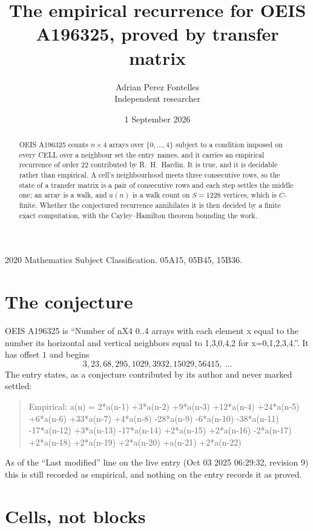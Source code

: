 \documentclass[11pt,a4paper]{article}
\title{The empirical recurrence for OEIS A196325, proved by transfer matrix}
\author{Adrian Perez Fontelles\\ \small Independent researcher}
\date{1 September 2026}
\theoremstyle{plain}
\theoremstyle{definition}
\begin{document}
\maketitle

\begin{abstract}
OEIS A196325 counts $n\times4$ arrays over $\{0,\dots,4\}$ subject to a condition imposed on
every CELL over a neighbour set the entry names, and it carries an empirical recurrence of
order $22$ contributed by R.~H.~Hardin. It is true, and it is decidable rather than
empirical. A cell's neighbourhood meets three consecutive rows, so the state of a transfer
matrix is a pair of consecutive rows and each step settles the middle one; an array is a
walk, and $a(n)$ is a walk count on $S=1228$ vertices, which is $C$-finite. Whether the
conjectured recurrence annihilates it is then decided by a finite exact computation, with the
Cayley--Hamilton theorem bounding the work.
\end{abstract}

\noindent\small 2020 Mathematics Subject Classification. 05A15, 05B45, 15B36.\normalsize

\section{The conjecture}

OEIS A196325 is ``Number of nX4 0..4 arrays with each element x equal to the number its horizontal and vertical neighbors equal to 1,3,0,4,2 for x=0,1,2,3,4.''. It has offset $1$ and begins
\[
3, 23, 68, 295, 1029, 3932, 15029, 56415,\ \dots
\]
The entry states, as a conjecture contributed by its author and never marked settled:
\begin{quote}
Empirical: a(n) = 2*a(n-1) +3*a(n-2) +9*a(n-3) +12*a(n-4) +24*a(n-5) +6*a(n-6) +33*a(n-7) +4*a(n-8) -28*a(n-9) -6*a(n-10) -38*a(n-11) -17*a(n-12) +3*a(n-13) -17*a(n-14) +2*a(n-15) +2*a(n-16) -2*a(n-17) +2*a(n-18) +2*a(n-19) +2*a(n-20) +a(n-21) +2*a(n-22)
\end{quote}
As of the ``Last modified'' line on the live entry (Oct 03 2025 06:29:32, revision 9) this is still
recorded as empirical, and nothing on the entry records it as proved.

\section{Cells, not blocks}
\end{document}
